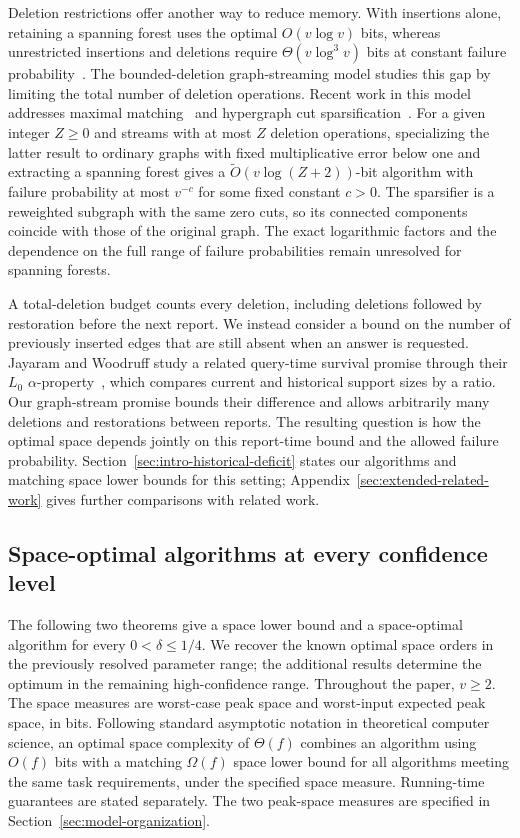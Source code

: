 \documentclass[11pt,letterpaper]{article}
\numberwithin{equation}{section}
\begin{document}
Deletion restrictions offer another way to reduce memory.
With insertions alone, retaining a spanning forest uses the optimal $O(v\log v)$ bits, whereas unrestricted insertions and deletions require $\Theta(v\log^3v)$ bits at constant failure probability~\cite{AGM2012,NelsonYu2019}.
The bounded-deletion graph-streaming model studies this gap by limiting the total number of deletion operations.
Recent work in this model addresses maximal matching~\cite{KKD2025} and hypergraph cut sparsification~\cite{KPS2025}.
For a given integer $Z\ge0$ and streams with at most $Z$ deletion operations, specializing the latter result to ordinary graphs with fixed multiplicative error below one and extracting a spanning forest gives a $\widetilde O(v\log(Z+2))$-bit algorithm with failure probability at most $v^{-c}$ for some fixed constant $c>0$.
The sparsifier is a reweighted subgraph with the same zero cuts, so its connected components coincide with those of the original graph.
The exact logarithmic factors and the dependence on the full range of failure probabilities remain unresolved for spanning forests.

A total-deletion budget counts every deletion, including deletions followed by restoration before the next report.
We instead consider a bound on the number of previously inserted edges that are still absent when an answer is requested.
Jayaram and Woodruff study a related query-time survival promise through their $L_0$ $\alpha$-property~\cite{JayaramWoodruff2018}, which compares current and historical support sizes by a ratio.
Our graph-stream promise bounds their difference and allows arbitrarily many deletions and restorations between reports.
The resulting question is how the optimal space depends jointly on this report-time bound and the allowed failure probability.
Section~\ref{sec:intro-historical-deficit} states our algorithms and matching space lower bounds for this setting; Appendix~\ref{sec:extended-related-work} gives further comparisons with related work.

\subsection{Space-optimal algorithms at every confidence level}

The following two theorems give a space lower bound and a space-optimal algorithm for every $0<\delta\le1/4$.
We recover the known optimal space orders in the previously resolved parameter range; the additional results determine the optimum in the remaining high-confidence range.
Throughout the paper, $v\ge2$.
The space measures are worst-case peak space and worst-input expected peak space, in bits.
Following standard asymptotic notation in theoretical computer science, an optimal space complexity of $\Theta(f)$ combines an algorithm using $O(f)$ bits with a matching $\Omega(f)$ space lower bound for all algorithms meeting the same task requirements, under the specified space measure.
Running-time guarantees are stated separately.
The two peak-space measures are specified in Section~\ref{sec:model-organization}.
\end{document}
